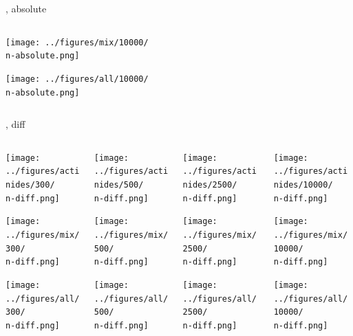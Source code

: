 \documentclass[
	11pt, %
	aspectratio=169, %
]{beamer}
\begin{document}
{\begin{frame}{\n, absolute}
\begin{columns}[c]
\begin{column}{0.25\textwidth}
			\texttt{[image: ../figures/mix/10000/\\n-absolute.png]}

			\texttt{[image: ../figures/all/10000/\\n-absolute.png]}
		\end{column}
	\end{columns}
\end{frame}

\begin{frame}{\n, diff}
	\begin{columns}[c] %
		\begin{column}{0.25\textwidth} %
			\texttt{[image: ../figures/actinides/300/\\n-diff.png]}

			\texttt{[image: ../figures/mix/300/\\n-diff.png]}

			\texttt{[image: ../figures/all/300/\\n-diff.png]}
		\end{column}
		\begin{column}{0.25\textwidth} %
			\texttt{[image: ../figures/actinides/500/\\n-diff.png]}

			\texttt{[image: ../figures/mix/500/\\n-diff.png]}

			\texttt{[image: ../figures/all/500/\\n-diff.png]}
		\end{column}
		\begin{column}{0.25\textwidth} %
			\texttt{[image: ../figures/actinides/2500/\\n-diff.png]}

			\texttt{[image: ../figures/mix/2500/\\n-diff.png]}

			\texttt{[image: ../figures/all/2500/\\n-diff.png]}
		\end{column}
		\begin{column}{0.25\textwidth} %
			\texttt{[image: ../figures/actinides/10000/\\n-diff.png]}

			\texttt{[image: ../figures/mix/10000/\\n-diff.png]}

			\texttt{[image: ../figures/all/10000/\\n-diff.png]}
		\end{column}
	\end{columns}
\end{frame}

}
\end{document}
